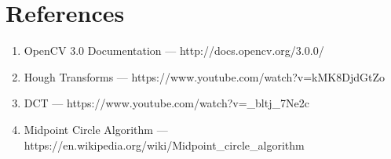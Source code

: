 \documentclass[12pt]{article}
\begin{document}
\section{References}

\begin{enumerate}
\item OpenCV 3.0 Documentation --- http://docs.opencv.org/3.0.0/
\item Hough Transforms --- https://www.youtube.com/watch?v=kMK8DjdGtZo
\item DCT --- https://www.youtube.com/watch?v={\_}bltj{\_}7Ne2c
\item Midpoint Circle Algorithm --- https://en.wikipedia.org/wiki/Midpoint{\_}circle{\_}algorithm
\end{enumerate}
\end{document}
